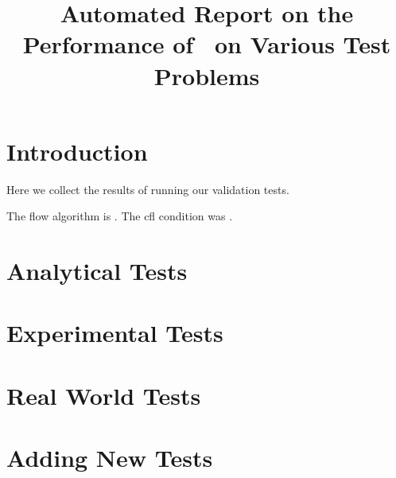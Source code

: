\documentclass[11pt,a4paper]{report}
\begin{document}
 
\title{Automated Report on the Performance of \anuga ~on Various Test Problems}
\maketitle
\tableofcontents
\chapter{Introduction}

Here we collect the results of running our validation tests.

The flow algorithm is \alg.
The cfl condition was \cfl.



\chapter{Analytical Tests}








\chapter{Experimental Tests}


\chapter{Real World Tests}


\appendix
\chapter{Adding New Tests}
\end{document}
